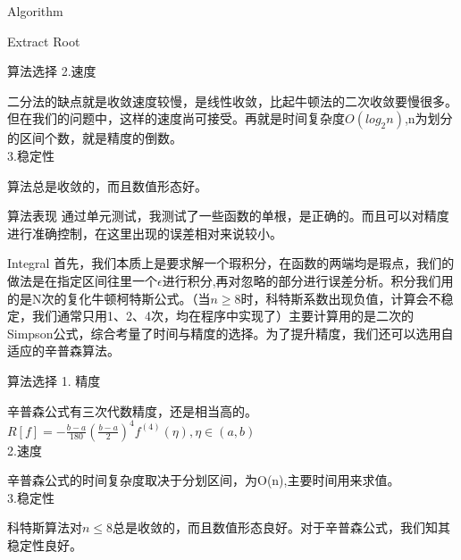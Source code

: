 \documentclass[letterpaper,12pt]{article}
\begin{document}
\begin{section}{Algorithm}
\begin{subsection}{Extract Root}
\begin{subsubsection}{算法选择}
	 		2.速度\par
	 		二分法的缺点就是收敛速度较慢，是线性收敛，比起牛顿法的二次收敛要慢很多。但在我们的问题中，这样的速度尚可接受。再就是时间复杂度$O(log_2n)$,n为划分的区间个数，就是精度的倒数。\\

	 		3.稳定性\par
	 		算法总是收敛的，而且数值形态好。\\

	 	\end{subsubsection}

	 	\begin{subsubsection}{算法表现}
	 		通过单元测试，我测试了一些函数的单根，是正确的。而且可以对精度进行准确控制，在这里出现的误差相对来说较小。
	 	\end{subsubsection}

	 \end{subsection}
	\begin{subsection}{Integral}
		首先，我们本质上是要求解一个瑕积分，在函数的两端均是瑕点，我们的做法是在指定区间往里一个$\epsilon$进行积分,再对忽略的部分进行误差分析。积分我们用的是N次的复化牛顿柯特斯公式。（当$n\ge8$时，科特斯系数出现负值，计算会不稳定，我们通常只用1、2、4次，均在程序中实现了）主要计算用的是二次的Simpson公式，综合考量了时间与精度的选择。为了提升精度，我们还可以选用自适应的辛普森算法。
	 	\begin{subsubsection}{算法选择}
	 		1. 精度\par
	 		辛普森公式有三次代数精度，还是相当高的。$R[f]=-\frac{b-a}{180}(\frac{b-a}{2})^4f^{(4)}(\eta),\eta\in(a,b)$\\ 

	 		2.速度\par
	 		辛普森公式的时间复杂度取决于分划区间，为O(n),主要时间用来求值。\\

	 		3.稳定性\par
	 		科特斯算法对$n\le8$总是收敛的，而且数值形态良好。对于辛普森公式，我们知其稳定性良好。\\

	 	\end{subsubsection}


\end{subsection}
\end{section}
\end{document}
